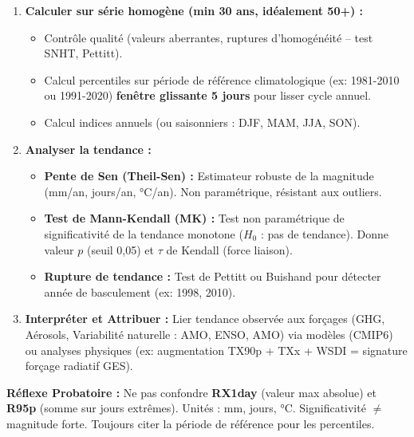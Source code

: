 \documentclass[11pt]{article}
\begin{document}
\begin{methode}
\begin{enumerate}
\begin{itemize}
\begin{itemize}
                        \end{itemize}
              \end{itemize}
        \item \textbf{Calculer sur série homogène (min 30 ans, idéalement 50+) :}
              \begin{itemize}
                  \item Contrôle qualité (valeurs aberrantes, ruptures d'homogénéité -- test SNHT, Pettitt).
                  \item Calcul percentiles sur période de référence climatologique (ex: 1981-2010 ou 1991-2020) \textbf{fenêtre glissante 5 jours} pour lisser cycle annuel.
                  \item Calcul indices annuels (ou saisonniers : DJF, MAM, JJA, SON).
              \end{itemize}
        \item \textbf{Analyser la tendance :}
              \begin{itemize}
                  \item \textbf{Pente de Sen (Theil-Sen) :} Estimateur robuste de la magnitude (mm/an, jours/an, °C/an). Non paramétrique, résistant aux outliers.
                  \item \textbf{Test de Mann-Kendall (MK) :} Test non paramétrique de significativité de la tendance monotone ($H_0$ : pas de tendance). Donne valeur $p$ (seuil 0,05) et $\tau$ de Kendall (force liaison).
                  \item \textbf{Rupture de tendance :} Test de Pettitt ou Buishand pour détecter année de basculement (ex: 1998, 2010).
              \end{itemize}
        \item \textbf{Interpréter et Attribuer :} Lier tendance observée aux forçages (GHG, Aérosols, Variabilité naturelle : AMO, ENSO, AMO) via modèles (CMIP6) ou analyses physiques (ex: augmentation TX90p + TXx + WSDI = signature forçage radiatif GES).
    \end{enumerate}
    \textbf{Réflexe Probatoire :} Ne pas confondre \textbf{RX1day} (valeur max absolue) et \textbf{R95p} (somme sur jours extrêmes). Unités : mm, jours, °C. Significativité $\neq$ magnitude forte. Toujours citer la période de référence pour les percentiles.
\end{methode}
\end{document}
